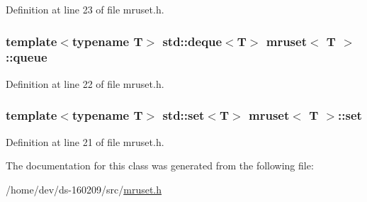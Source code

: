 Definition at line 23 of file mruset.\+h.

\hypertarget{classmruset_a6be1fe81dc472e25e160911288373663}{}
\subsubsection[{queue}]{\setlength{\rightskip}{0pt plus 5cm}template$<$typename T$>$ std\+::deque$<$T$>$ {\bf mruset}$<$ T $>$\+::queue\hspace{0.3cm}{\ttfamily [protected]}}\label{classmruset_a6be1fe81dc472e25e160911288373663}


Definition at line 22 of file mruset.\+h.

\hypertarget{classmruset_a4981fc3556b61600418b2ddad98cc685}{}
\subsubsection[{set}]{\setlength{\rightskip}{0pt plus 5cm}template$<$typename T$>$ std\+::set$<$T$>$ {\bf mruset}$<$ T $>$\+::set\hspace{0.3cm}{\ttfamily [protected]}}\label{classmruset_a4981fc3556b61600418b2ddad98cc685}


Definition at line 21 of file mruset.\+h.



The documentation for this class was generated from the following file\+:\begin{DoxyCompactItemize}
\item 
/home/dev/ds-\/160209/src/\hyperlink{mruset_8h}{mruset.\+h}\end{DoxyCompactItemize}
